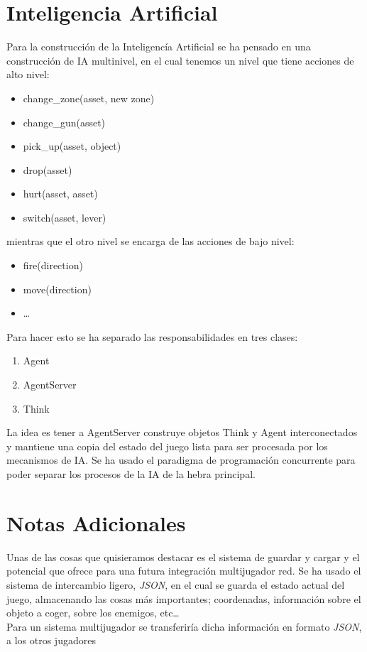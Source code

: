 \documentclass{article}
\begin{document}
\section{Inteligencia Artificial}

Para la construcción de la Inteligencía Artificial se ha pensado en una construcción de IA multinivel,
en el cual tenemos un nivel que tiene acciones de alto nivel:
    \begin{itemize}
        \item change\_zone(asset, new zone)
        \item change\_gun(asset)
        \item pick\_up(asset, object)
        \item drop(asset)
        \item hurt(asset, asset)
        \item switch(asset, lever)
    \end{itemize}

mientras que el otro nivel se encarga de las acciones de bajo nivel:
    \begin{itemize}
        \item fire(direction)
        \item move(direction)
        \item \ldots
    \end{itemize}

Para hacer esto se ha separado las responsabilidades en tres clases:
    \begin{enumerate}
        \item Agent
        \item AgentServer
        \item Think
    \end{enumerate}

La idea es tener a AgentServer construye objetos Think y Agent interconectados
y mantiene una copia del estado del juego lista para ser procesada por los mecanismos de IA.
Se ha usado el paradigma de programación concurrente para poder separar los procesos de la IA de la hebra principal.

\section{Notas Adicionales}

Unas de las cosas que quisieramos destacar es el sistema de guardar y cargar y el
potencial que ofrece para una futura integración multijugador red. Se ha usado
el sistema de intercambio ligero, \textit{JSON}, en el cual se guarda el estado actual del
juego, almacenando las cosas más importantes; coordenadas, información sobre el
objeto a coger, sobre los enemigos, etc\ldots \hfill \\
Para un sistema multijugador se transferiría dicha información en formato \textit{JSON},
a los otros jugadores
\end{document}
